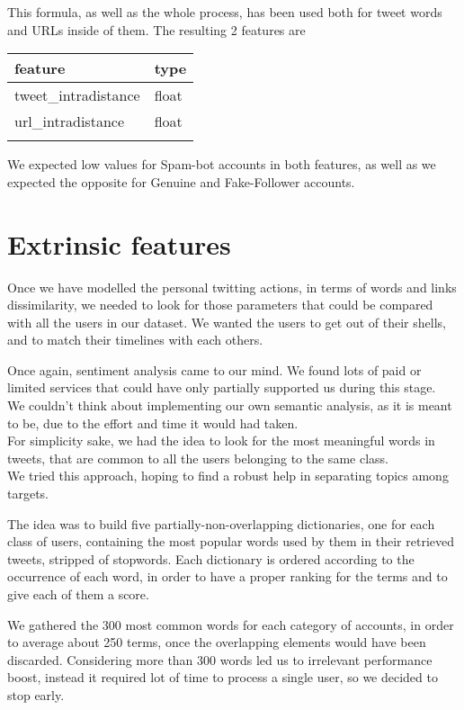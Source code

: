 This formula, as well as the whole process, has been used both for tweet words and URLs inside of them.
The resulting 2 features are
\small
\begin{center}
	\begin{tabular}{ll}
		\\feature&type\\
		\hline\hline
		tweet\_intradistance&float\\
		url\_intradistance&float\\\hline\\
	\end{tabular}
\end{center}
\normalsize
We expected low values for Spam-bot accounts in both features, as well as we expected the opposite for Genuine and Fake-Follower accounts.


\section{Extrinsic features}
Once we have modelled the personal twitting actions, in terms of words and links dissimilarity, we needed to look for those parameters that could be compared with all the users in our dataset.
We wanted the users to get out of their shells, and to match their timelines with each others.

Once again, sentiment analysis came to our mind. We found lots of paid or limited services that could have only partially supported us during this stage.\\
We couldn't think about implementing our own semantic analysis, as it is meant to be, due to the effort and time it would had taken.\\
For simplicity sake, we had the idea to look for the most meaningful words in tweets, that are common to all the users belonging to the same class.\\
We tried this approach, hoping to find a robust help in separating topics among targets.

The idea was to build five partially-non-overlapping dictionaries, one for each class of users, containing the most popular words used by them in their retrieved tweets, stripped of stopwords. Each dictionary is ordered according to the occurrence of each word, in order to have a proper ranking for the terms and to give each of them a score.

We gathered the 300 most common words for each category of accounts, in order to average about 250 terms, once the overlapping elements would have been discarded.
Considering more than 300 words led us to irrelevant performance boost, instead it required lot of time to process a single user, so we decided to stop early.


